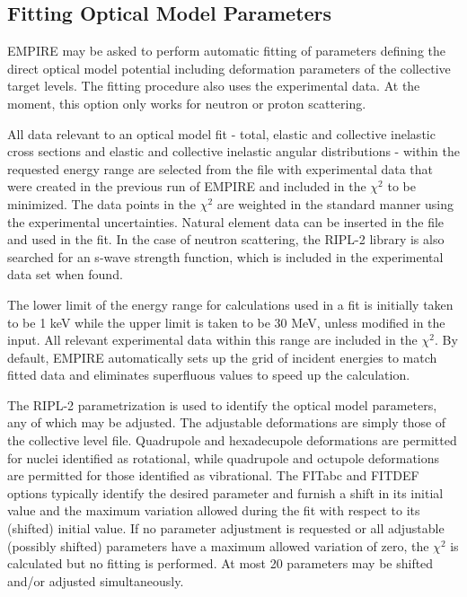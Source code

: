 \subsection{Fitting Optical Model Parameters}

EMPIRE may be asked to perform automatic fitting of parameters defining the
direct optical model potential including deformation parameters of the
collective target levels. The fitting procedure also uses the experimental
data. At the moment, this option only works for neutron or proton scattering.

All data relevant to an optical model fit - total, elastic and collective
inelastic cross sections and elastic and collective inelastic angular
distributions - within the requested energy range are selected from the file
with experimental data that were created in the previous run of EMPIRE and
included in the $\chi^{2}$ to be minimized. The data points in the $\chi^{2}$
are weighted in the standard manner using the experimental uncertainties.
Natural element data can be inserted in the file and used in the fit. In the
case of neutron scattering, the RIPL-2 library is also searched for an
s-wave strength function, which is included in the experimental data set
when found.

The lower limit of the energy range for calculations used in a fit is
initially taken to be 1 keV while the upper limit is taken to be 30 MeV,
unless modified in the input. All relevant experimental data within this
range are included in the $\chi^{2}$. By default, EMPIRE automatically sets
up the grid of incident energies to match fitted data and eliminates
superfluous values to speed up the calculation.

The RIPL-2 parametrization is used to identify the optical model parameters,
any of which may be adjusted. The adjustable deformations are simply those
of the collective level file. Quadrupole and hexadecupole deformations are
permitted for nuclei identified as rotational, while quadrupole and octupole
deformations are permitted for those identified as vibrational. The FITabc
and FITDEF options typically identify the desired parameter and furnish a
shift in its initial value and the maximum variation allowed during the fit
with respect to its (shifted) initial value. If no parameter adjustment is
requested or all adjustable (possibly shifted) parameters have a maximum
allowed variation of zero, the $\chi^{2}$ is calculated but no fitting is
performed. At most 20 parameters may be shifted and/or adjusted
simultaneously.


